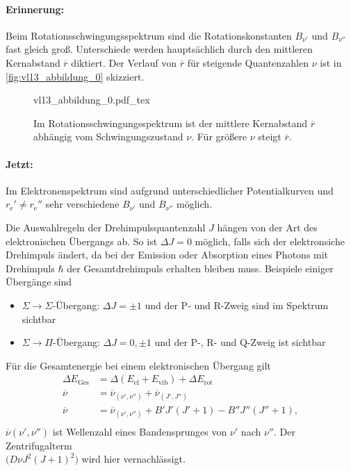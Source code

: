\setcounter{section}{6}
\setcounter{subsection}{4}
\setcounter{figure}{6}


	\paragraph{Erinnerung:} Beim Rotationsschwingungsspektrum sind die Rotationskonstanten $B_{\nu'}$ und $B_{\nu''}$ fast gleich groß. 
	Unterschiede werden hauptsächlich durch den mittleren Kernabstand $\overline r$ diktiert. 
	Der Verlauf von $\overline r$ für steigende Quantenzahlen $\nu$ ist in \autoref{fig:vl13_abbildung_0} skizziert.

	\begin{figure}[H]
		\centering
		\def\svgwidth{.3\columnwidth}
		{vl13_abbildung_0.pdf_tex}
		\caption{Im Rotationsschwingungsspektrum ist der mittlere Kernabstand $\overline r$ abhängig vom Schwingungszustand $\nu$. Für größere $\nu$ steigt $\overline r$.}
		\label{fig:vl13_abbildung_0}
	\end{figure}

	\paragraph{Jetzt:} Im Elektronenspektrum sind aufgrund unterschiedlicher Potentialkurven und ${r}_{\mathrm{e}}' \neq {r}_{\mathrm{e}}''$ sehr verschiedene $B_{\nu'}$ und $B_{\nu''}$ möglich.

	Die Auswahlregeln der Drehimpulsquantenzahl $J$ hängen von der Art des elektronischen Übergangs ab. So ist $\Delta J = 0$ möglich, falls sich der elektronsiche Drehimpuls ändert,	 da bei der Emission oder Absorption eines Photons mit Drehimpuls $\hbar $ der Gesamtdrehimpuls erhalten bleiben muss. Beispiele einiger Übergänge sind
	\begin{itemize}
		\item $\Sigma \to \Sigma$-Übergang: $\Delta J = \pm 1$ und der  P- und R-Zweig sind im Spektrum sichtbar
		\item $\Sigma \to \Pi$-Übergang: $\Delta J = 0, \pm 1$ und der P-, R- und Q-Zweig ist sichtbar
	\end{itemize}
	Für die Gesamtenergie bei einem elektronischen Übergang gilt
	$$
	\begin{aligned}
		\Delta E_{\text{Ges}} &= \Delta \left( E_{\text{el}} + E_{\text{vib}} \right) + \Delta E_{\text{rot}} \\
		\overline{\nu} &= \overline{\nu}_{(\nu', \nu'')} + \overline{\nu}_{(J', J'')} \\
		\overline{\nu} &= \overline{\nu}_{(\nu', \nu'')} + B'J'(J'+1) - B''J''(J''+1), \\
	\end{aligned}
	$$ 
	$\overline\nu(\nu', \nu'')$ ist Wellenzahl eines Bandensprunges von $\nu'$ nach $\nu''$. Der Zentrifugalterm \\${\big(D\nu J^2(J+1)^2\big)}$ wird hier vernachlässigt.

